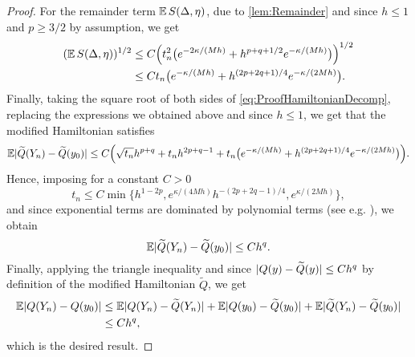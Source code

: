 \documentclass[10pt]{article}
\begin{document}
{\begin{proof}
	For the remainder term $\operatorname{\mathbb{E}} S(\Delta, \eta)$, due to \cref{lem:Remainder} and since $h \leq 1$ and $p \geq 3/2$ by assumption, we get
	\begin{equation}\label{eq:BoundS}
	\begin{aligned}
		(\operatorname{\mathbb{E}} S(\Delta, \eta))^{1/2} &\leq C \Big( t_n^2 \big(e^{-2\kappa/(Mh)} + h^{p+q+1/2}e^{-\kappa/(Mh)}\big) \Big)^{1/2}\\
		&\leq C t_n \big(e^{-\kappa/(Mh)} + h^{(2p+2q+1)/4}e^{-\kappa/(2Mh)}\big).
	\end{aligned}
	\end{equation}
	Finally, taking the square root of both sides of \eqref{eq:ProofHamiltonianDecomp}, replacing the expressions we obtained above and since $h \leq 1$, we get that the modified Hamiltonian satisfies
	\begin{equation}
	\begin{aligned}
		\operatorname{\mathbb{E}} \lvert\widetilde Q(Y_n) - \widetilde Q(y_0)\rvert \leq C \Big(\sqrt{t_n} h^{p+q} + t_n h^{2p+q-1} + t_n \big(e^{-\kappa/(Mh)} + h^{(2p+2q+1)/4}e^{-\kappa/(2Mh)}\big)\Big).
	\end{aligned}
	\end{equation}
	Hence, imposing for a constant $C > 0$
	\begin{equation}
		t_n \leq C \min\{h^{1-2p}, e^{\kappa/(4Mh)} h^{-(2p+2q-1)/4}, e^{\kappa/(2Mh)}\},
	\end{equation}
	and since exponential terms are dominated by polynomial terms (see e.g. \cite[Theorem IX.8.1]{HLW06}), we obtain
	\begin{equation}
		\operatorname{\mathbb{E}} \lvert\widetilde Q(Y_n) - \widetilde Q(y_0)\rvert \leq Ch^q.
	\end{equation}
	Finally, applying the triangle inequality and since $\lvert Q(y) - \widetilde Q(y)\rvert \leq Ch^q$ by definition of the modified Hamiltonian $\tilde Q$, we get
	\begin{equation}
	\begin{aligned}
		\operatorname{\mathbb{E}}\lvert Q(Y_n) - Q(y_0)\rvert &\leq \operatorname{\mathbb{E}}\lvert Q(Y_n) - \widetilde Q(Y_n)\rvert + \operatorname{\mathbb{E}} \lvert Q(y_0) - \widetilde Q (y_0)\rvert + \operatorname{\mathbb{E}}\lvert\widetilde Q(Y_n) - \widetilde Q(y_0)\rvert \\
		&\leq C h^q,
	\end{aligned}
	\end{equation}
	which is the desired result.
\end{proof}}
\end{document}
